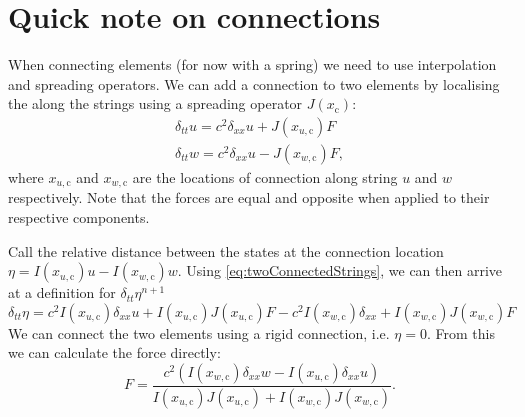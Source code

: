 \documentclass[dvipsnames]{article}
\begin{document}
\begin{figure}[h]
    \centering
    \caption{}\label{eq:interpolated}
\end{figure}

\section{Quick note on connections}
When connecting elements (for now with a spring) we need to use interpolation and spreading operators. We can add a connection to two elements by localising the along the strings using a spreading operator $J(x_\text{c})$:
\begin{align}\label{eq:twoConnectedStrings}
    \delta_{tt}u = c^2 \delta_{xx}u + J(x_{u,\text{c}})F\\
    \delta_{tt}w = c^2 \delta_{xx}u - J(x_{w,\text{c}})F,
\end{align}
where $x_{u,\text{c}}$ and $x_{w,\text{c}}$ are the locations of connection along string $u$ and $w$ respectively. Note that the forces are equal and opposite when applied to their respective components. 

Call the relative distance between the states at the connection location $\eta = I(x_{u,\text{c}})u - I(x_{w,\text{c}})w$. Using \eqref{eq:twoConnectedStrings}, we can then arrive at a definition for $\delta_{tt}\eta^{n+1}$
\begin{equation}
    \delta_{tt}\eta = c^2I(x_{u,\text{c}})\delta_{xx}u +  I(x_{u,\text{c}})J(x_{u,\text{c}})F - c^2 I(x_{w,\text{c}})\delta_{xx} + I(x_{w,\text{c}})J(x_{w,\text{c}})F
\end{equation}
We can connect the two elements using a rigid connection, i.e. $\eta = 0$. From this we can calculate the force directly:
\begin{equation}
    F = \frac{c^2(I(x_{w,\text{c}})\delta_{xx}w-I(x_{u,\text{c}})\delta_{xx}u)}{I(x_{u,\text{c}})J(x_{u,\text{c}}) + I(x_{w,\text{c}})J(x_{w,\text{c}})}.
\end{equation}
\end{document}
